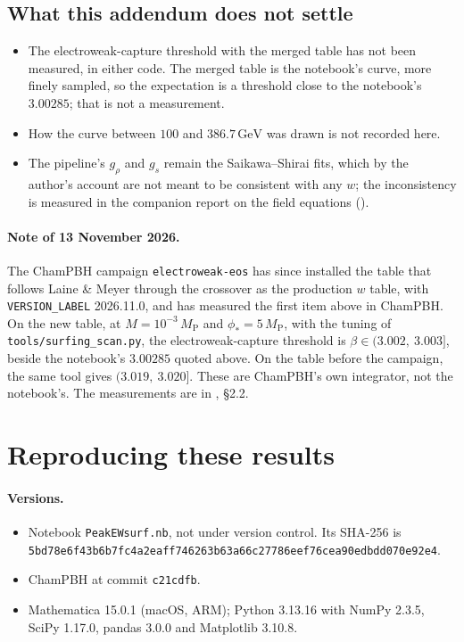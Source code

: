 \documentclass[11pt,a4paper]{article}
\newcommand{\MP}{M_{\mathrm{P}}}
\newcommand{\GeV}{\,\mathrm{GeV}}
\newcommand{\code}[1]{\texttt{#1}}
\begin{document}
\subsection{What this addendum does not settle}

\begin{itemize}
\item The electroweak-capture threshold with the merged table has not been measured, in either code.
  The merged table is the notebook's curve, more finely sampled, so the expectation is a threshold
  close to the notebook's $3.00285$; that is not a measurement.
\item How the curve between $100$ and $386.7\GeV$ was drawn is not recorded here.
\item The pipeline's $g_\rho$ and $g_s$ remain the Saikawa--Shirai fits, which by the author's account
  are not meant to be consistent with any $w$; the inconsistency is measured in the companion report
  on the field equations ().
\end{itemize}

\paragraph{Note of 13 November 2026.}
The ChamPBH campaign \code{electroweak-eos} has since installed the table that follows Laine \& Meyer through the
crossover as the production $w$ table, with \code{VERSION\_LABEL} 2026.11.0, and has measured the first item above in
ChamPBH. On the new table, at $M = 10^{-3}\,\MP$ and $\phi_* = 5\,\MP$, with the tuning of
\code{tools/surfing\_scan.py}, the electroweak-capture threshold is $\beta \in (3.002,\ 3.003]$, beside the notebook's
$3.00285$ quoted above. On the table before the campaign, the same tool gives $(3.019,\ 3.020]$. These are ChamPBH's own
integrator, not the notebook's. The measurements are in , \S2.2.

\appendix
\section{Reproducing these results}

\paragraph{Versions.}
\begin{itemize}
\item Notebook \code{PeakEWsurf.nb}, not under version control. Its SHA-256 is\\
  {\small\code{5bd78e6f43b6b7fc4a2eaff746263b63a66c27786eef76cea90edbdd070e92e4}}.
\item ChamPBH at commit \code{c21cdfb}.
\item Mathematica 15.0.1 (macOS, ARM); Python 3.13.16 with NumPy 2.3.5, SciPy 1.17.0,
  pandas 3.0.0 and Matplotlib 3.10.8.
\end{itemize}
\end{document}
